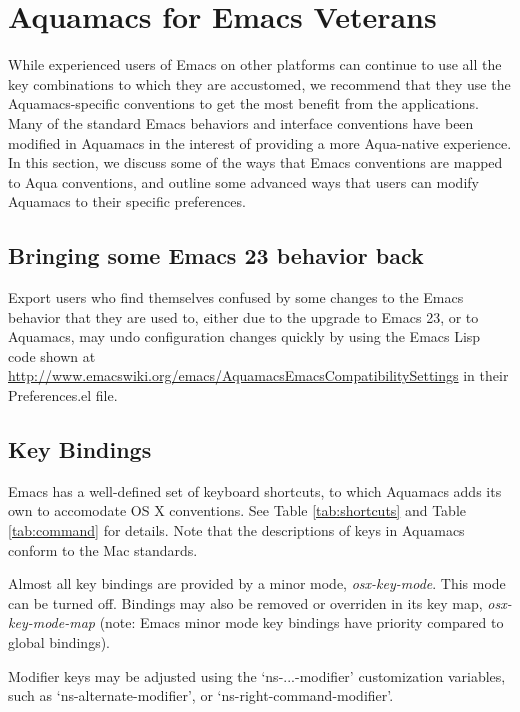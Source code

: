 \documentclass[11pt,letterpaper]{article}
\begin{document}
\section{Aquamacs for Emacs Veterans}

While experienced users of Emacs on other platforms can continue to use all the key combinations to which they are accustomed, we recommend that they use the Aquamacs-specific conventions to get the most benefit from the applications.  Many of the standard Emacs behaviors and interface conventions have been modified in Aquamacs in the interest of providing a more Aqua-native experience. In this section, we discuss some of the ways that Emacs conventions are mapped to Aqua conventions, and outline some advanced ways that users can modify Aquamacs to their specific preferences.

\subsection{Bringing some Emacs 23 behavior back}

Export users who find themselves confused by some changes to the Emacs behavior that they are used to, either due to the upgrade to Emacs 23, or to Aquamacs, may undo configuration changes quickly by using the Emacs Lisp code shown at \url{http://www.emacswiki.org/emacs/AquamacsEmacsCompatibilitySettings} in their Preferences.el file.

\subsection{Key Bindings}
Emacs has a well-defined set of keyboard shortcuts, to which Aquamacs adds its own to accomodate OS X conventions. See Table \ref{tab:shortcuts} and Table \ref{tab:command} for details.
Note that the descriptions of keys in Aquamacs conform to the Mac standards.

Almost all key bindings are provided by a minor mode, \emph{osx-key-mode}.  This mode can be turned off.  Bindings may also be removed or overriden in its key map, \emph{osx-key-mode-map} (note: Emacs minor mode key bindings have priority compared to global bindings).

Modifier keys may be adjusted using the `ns-...-modifier' customization variables, such as `ns-alternate-modifier', or `ns-right-command-modifier'.
\end{document}
